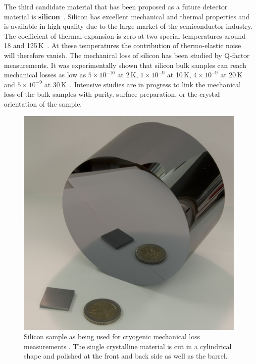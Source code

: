 The third candidate material that has been proposed as a future detector material is {\bf silicon}~\cite{Punturo2010, Rowan2003}. Silicon has excellent mechanical and thermal properties and is available in high quality due to the large market of the semiconductor industry. The coefficient of thermal expansion is zero at two special temperatures around 18 and 125\,K~\cite{MPDB}. At these temperatures the contribution of thermo-elastic noise will therefore vanish. The mechanical loss of silicon has been studied by Q-factor measurements. It was experimentally shown that silicon bulk samples can reach mechanical losses as low as $5\times10^{-10}$ at 2\,K, $1\times10^{-9}$ at 10\,K, $4\times10^{-9}$ at 20\,K and $5\times10^{-9}$ at 30\,K~\cite{McGuigan1978}. Intensive studies are in progress to link the mechanical loss of the bulk samples with purity, surface preparation, or the crystal orientation of the sample. 

\begin{figure}[h1]
\begin{center}
\includegraphics[width=0.49\linewidth]{Sec_Optics/Si_bulk.jpg}
\caption{Silicon sample as being used for cryogenic mechanical loss measurements \cite{Nawrodt2008}. The single crystalline material is cut in a cylindrical shape and polished at the front and back side as well as the barrel.}
\label{fig:si_pic}
\end{center}
\end{figure}

